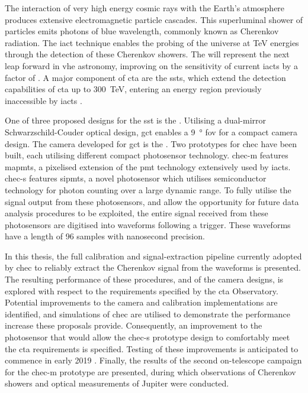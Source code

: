 The interaction of very high energy cosmic rays with the Earth's atmosphere produces extensive electromagnetic particle cascades. This superluminal shower of particles emits photons of blue wavelength, commonly known as Cherenkov radiation. The \gls{iact} technique enables the probing of the universe at \si{TeV} energies through the detection of these Cherenkov showers. The  will represent the next leap forward in \gls{vhe} astronomy, improving on the sensitivity of current \glspl{iact} by a factor of . A major component of \gls{cta} are the \glspl{sst}, which extend the detection capabilities of \gls{cta} up to \SI{300}{TeV}, entering an energy region previously inaccessible by \glspl{iact} . 

One of three proposed designs for the \gls{sst} is the . Utilising a dual-mirror Schwarzschild-Couder optical design, \gls{gct} enables a \SI{9}{\degree} \gls{fov} for a compact camera design. The camera developed for \gls{gct} is the . Two prototypes for \gls{chec} have been built, each utilising different compact photosensor technology. \gls{chec-m} features \glspl{mapmt}, a pixelised extension of the \gls{pmt} technology extensively used by \glspl{iact}. \gls{chec-s} features \glspl{sipmt}, a novel photosensor which utilises semiconductor technology for photon counting over a large dynamic range. To fully utilise the signal output from these photosensors, and allow the opportunity for future data analysis procedures to be exploited, the entire signal received from these photosensors are digitised into waveforms following a trigger. These waveforms have a length of 96 samples with nanosecond precision.

In this thesis, the full calibration and signal-extraction pipeline currently adopted by \gls{chec} to reliably extract the Cherenkov signal from the waveforms is presented. The resulting performance of these procedures, and of the camera designs, is explored with respect to the requirements specified by the \gls{cta} Observatory. Potential improvements to the camera and calibration implementations are identified, and simulations of \gls{chec} are utilised to demonstrate the performance increase these proposals provide. Consequently, an improvement to the photosensor that would allow the \gls{chec-s} prototype design to comfortably meet the \gls{cta} requirements is specified. Testing of these improvements is anticipated to commence in early 2019 . Finally, the results of the second on-telescope campaign for the \gls{chec-m} prototype are presented, during which observations of Cherenkov showers and optical measurements of Jupiter were conducted.


